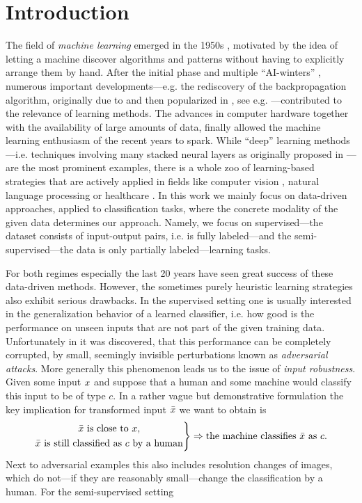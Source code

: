 \chapter{Introduction}
%
%
The field of \textit{machine learning} emerged in the 1950s \cite{samuel1959some, rosenblatt1958perceptron}, motivated by the idea of letting a machine discover algorithms and patterns without having to explicitly arrange them by hand. After the initial phase and multiple \enquote{AI-winters} \cite{steele1996evolution}, numerous important developments---e.g. the rediscovery of the backpropagation algorithm, originally due to \cite{kelley1960gradient,rosenblatt1962principles} and then popularized in \cite{rumelhart1986learning}, see e.g. \cite{schmidhuber2022annotated}---contributed to the relevance of learning methods. The advances in computer hardware together with the availability of large amounts of data, finally allowed the machine learning enthusiasm of the recent years to spark. While \enquote{deep} learning methods---i.e. techniques involving many stacked neural layers as originally proposed in \cite{rosenblatt1958perceptron}---are the most prominent examples, there is a whole zoo of learning-based strategies that are actively applied in fields like computer vision \cite{chai2021deep}, natural language processing \cite{khurana2023natural} or healthcare \cite{shehab2022machine}. In this work we mainly focus on data-driven approaches, applied to classification tasks, where the concrete modality of the given data determines our approach. Namely, we focus on supervised---the dataset consists of input-output pairs, i.e. is fully labeled---and the semi-supervised---the data is only partially labeled---learning tasks.

For both regimes especially the last 20 years have seen great success of these data-driven methods. However, the sometimes purely heuristic learning strategies also exhibit serious drawbacks. In the supervised setting one is usually interested in the generalization behavior of a learned classifier, i.e. how good is the performance on unseen inputs that are not part of the given training data. Unfortunately in \cite{goodfellow2014explaining} it was discovered, that this performance can be completely corrupted, by small, seemingly invisible perturbations known as \textit{adversarial attacks}. More generally this phenomenon leads us to the issue of \textit{input robustness}. Given some input $x$ and suppose that a human and some machine would classify this input to be of type $c$. In a rather vague but demonstrative formulation the key implication for transformed input $\bar{x}$ we want to obtain is
%
\begin{align*}
\left.
\begin{gathered}
\bar{x}\text{ is close to }x,\\
\bar{x}\text{ is still classified as }c\text{ by a human}
\end{gathered}
\right\}
\Rightarrow
\text{the machine classifies }\bar{x}\text{ as } c. 
\end{align*}
%
Next to adversarial examples this also includes resolution changes of images, which do not---if they are reasonably small---change the classification by a human. For the semi-supervised setting 